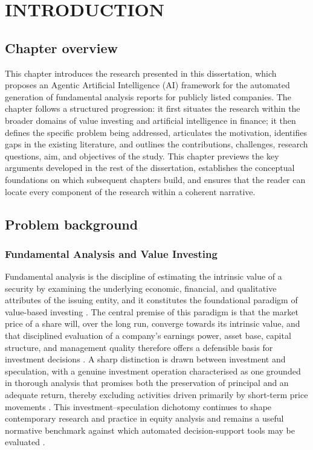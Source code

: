 \chapter{INTRODUCTION}

\section{Chapter overview}
\label{sec:overview}

This chapter introduces the research presented in this dissertation, which proposes an Agentic Artificial Intelligence (AI) framework for the automated generation of fundamental analysis reports for publicly listed companies. The chapter follows a structured progression: it first situates the research within the broader domains of value investing and artificial intelligence in finance; it then defines the specific problem being addressed, articulates the motivation, identifies gaps in the existing literature, and outlines the contributions, challenges, research questions, aim, and objectives of the study. This chapter previews the key arguments developed in the rest of the dissertation, establishes the conceptual foundations on which subsequent chapters build, and ensures that the reader can locate every component of the research within a coherent narrative.


\section{Problem background}
\label{sec:background}

\subsection{Fundamental Analysis and Value Investing}
\label{subsec:domain}

Fundamental analysis is the discipline of estimating the intrinsic value of a security by examining the underlying economic, financial, and qualitative attributes of the issuing entity, and it constitutes the foundational paradigm of value-based investing \citep{GrahamDodd2008}. The central premise of this paradigm is that the market price of a share will, over the long run, converge towards its intrinsic value, and that disciplined evaluation of a company's earnings power, asset base, capital structure, and management quality therefore offers a defensible basis for investment decisions \citep{Graham2006}. A sharp distinction is drawn between investment and speculation, with a genuine investment operation characterised as one grounded in thorough analysis that promises both the preservation of principal and an adequate return, thereby excluding activities driven primarily by short-term price movements \citep{Graham2006}. This investment--speculation dichotomy continues to shape contemporary research and practice in equity analysis and remains a useful normative benchmark against which automated decision-support tools may be evaluated \citep{Li2026FINSABER}.

